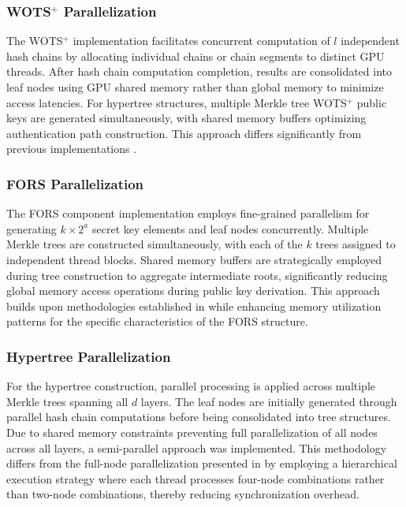 \documentclass[journal]{IEEEtran}
\begin{document}
\subsubsection{WOTS\texorpdfstring{$^+$}{+} Parallelization}

The WOTS$^+$ implementation facilitates concurrent computation of $l$ independent hash chains by allocating individual chains or chain segments to distinct GPU threads. After hash chain computation completion, results are consolidated into leaf nodes using GPU shared memory rather than global memory to minimize access latencies. For hypertree structures, multiple Merkle tree WOTS$^+$ public keys are generated simultaneously, with shared memory buffers optimizing authentication path construction. This approach differs significantly from previous implementations \cite{Kim2024}.

\subsubsection{FORS Parallelization}

The FORS component implementation employs fine-grained parallelism for generating $k \times 2^a$ secret key elements and leaf nodes concurrently. Multiple Merkle trees are constructed simultaneously, with each of the $k$ trees assigned to independent thread blocks. Shared memory buffers are strategically employed during tree construction to aggregate intermediate roots, significantly reducing global memory access operations during public key derivation. This approach builds upon methodologies established in \cite{Wang2025} while enhancing memory utilization patterns for the specific characteristics of the FORS structure.

\subsubsection{Hypertree Parallelization}

For the hypertree construction, parallel processing is applied across multiple Merkle trees spanning all $d$ layers. The leaf nodes are initially generated through parallel hash chain computations before being consolidated into tree structures. Due to shared memory constraints preventing full parallelization of all nodes across all layers, a semi-parallel approach was implemented. This methodology differs from the full-node parallelization presented in \cite{Wang2025} by employing a hierarchical execution strategy where each thread processes four-node combinations rather than two-node combinations, thereby reducing synchronization overhead.
\end{document}
